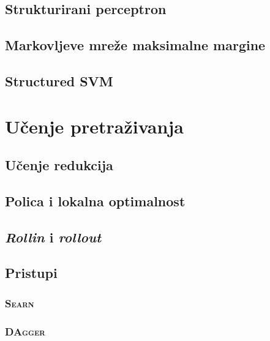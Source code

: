 \documentclass[times, utf8, diplomski]{fer}
\begin{document}
\section{Strukturirani perceptron}


\section{Markovljeve mreže maksimalne margine}

\section{Structured SVM}

\chapter{Učenje pretraživanja}


\section{Učenje redukcija}


\section{Polica i lokalna optimalnost}


\section{\emph{Rollin} i \emph{rollout}}


\section{Pristupi}\label{ch:metodesearchlearn}

\subsection{\textsc{Searn}}


\subsection{\textsc{DAgger}}
\end{document}

